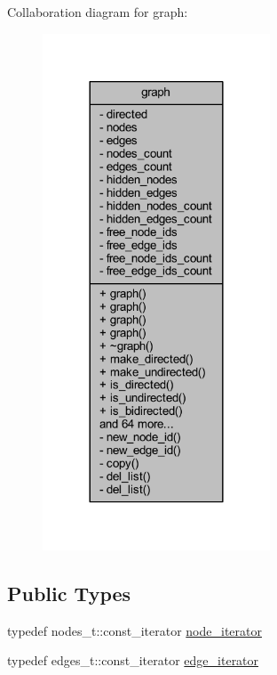 Collaboration diagram for graph\+:\nopagebreak
\begin{figure}[H]
\begin{center}
\leavevmode
\includegraphics[width=192pt]{classgraph__coll__graph}
\end{center}
\end{figure}
\subsection*{Public Types}
\begin{DoxyCompactItemize}
\item 
typedef nodes\+\_\+t\+::const\+\_\+iterator \mbox{\hyperlink{classgraph_a2cb374b84c133ce13f94e73c3e5da7fa}{node\+\_\+iterator}}
\item 
typedef edges\+\_\+t\+::const\+\_\+iterator \mbox{\hyperlink{classgraph_a818d3766018eb0af91d520ce2150203c}{edge\+\_\+iterator}}
\end{DoxyCompactItemize}
